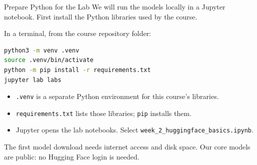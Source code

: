 \documentclass[aspectratio=169]{beamer}
\begin{document}
\begin{frame}[fragile]{Prepare Python for the Lab}
  \small We will run the models locally in a Jupyter notebook. First install the Python libraries used by the course.
  \par\vspace{0.5em}
  In a terminal, from the course repository folder:
  \begin{lstlisting}[language=bash]
python3 -m venv .venv
source .venv/bin/activate
python -m pip install -r requirements.txt
jupyter lab labs
  \end{lstlisting}
  \begin{itemize}
    \item \texttt{.venv} is a separate Python environment for this course's libraries.
    \item \texttt{requirements.txt} lists those libraries; \texttt{pip} installs them.
    \item Jupyter opens the lab notebooks. Select \texttt{week\_2\_huggingface\_basics.ipynb}.
  \end{itemize}
  \small The first model download needs internet access and disk space. Our core models are public: no Hugging Face login is needed.
\end{frame}
\end{document}
